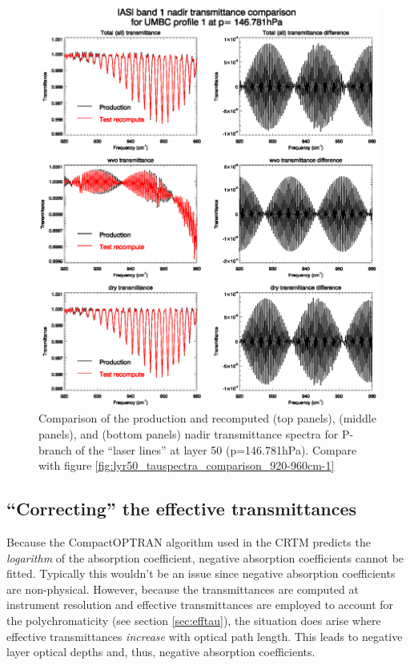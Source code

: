 \begin{figure}[htp]
  \centering
  \includegraphics[scale=0.8]{graphics/correct_lyr50_tauspectra_comparison_920-960cm-1.eps}
  \caption{Comparison of the production and recomputed  (top panels),  (middle panels), and  (bottom panels) nadir transmittance spectra for P-branch of the  \carbondioxide{} ``laser lines'' at layer 50 (p=146.781hPa). Compare with figure \ref{fig:lyr50_tauspectra_comparison_920-960cm-1}}
  \label{fig:correct_lyr50_tauspectra_comparison_920-960cm-1}
\end{figure}


\subsection{``Correcting'' the effective transmittances}
\label{sec:correct_efftau}
Because the CompactOPTRAN algorithm used in the CRTM predicts the \emph{logarithm} of the absorption coefficient, negative absorption coefficients cannot be fitted. Typically this wouldn't be an issue since negative absorption coefficients are non-physical. However, because the transmittances are computed at instrument resolution and effective transmittances are employed to account for the polychromaticity (see section \ref{sec:efftau}), the situation does arise where effective transmittances \emph{increase} with optical path length. This leads to negative layer optical depths and, thus, negative absorption coefficients.

